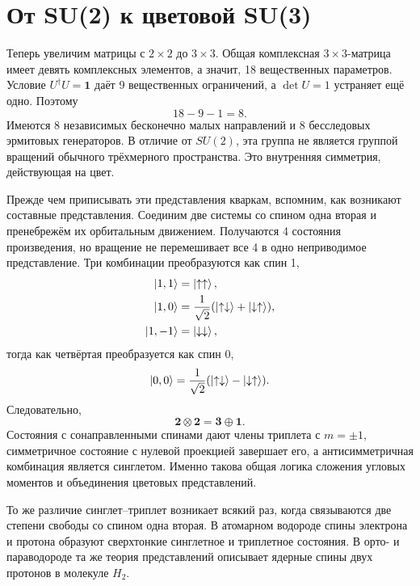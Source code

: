 \section{От SU(2) к цветовой SU(3)}

Теперь увеличим матрицы с \(2\times2\) до \(3\times3\). Общая комплексная
\(3\times3\)-матрица имеет девять комплексных элементов, а значит, 18 вещественных параметров.
Условие \(U^\dagger U=\boldsymbol 1\) даёт 9 вещественных ограничений,
а \(\det U=1\) устраняет ещё одно. Поэтому
\begin{equation}
18-9-1=8.
\end{equation}
Имеются 8 независимых бесконечно малых направлений и 8 бесследовых
эрмитовых генераторов. В отличие от \(SU(2)\), эта группа не является группой вращений
обычного трёхмерного пространства. Это внутренняя симметрия, действующая на
цвет.

Прежде чем приписывать эти представления кваркам, вспомним, как возникают составные
представления. Соединим две системы со спином одна вторая и пренебрежём
их орбитальным движением. Получаются 4 состояния произведения, но вращение не перемешивает все 4 в одно неприводимое представление. Три комбинации преобразуются как спин 1,
\begin{align}
\left\lvert1,1\right\rangle&=\left\lvert\uparrow\uparrow\right\rangle,\\
\left\lvert1,0\right\rangle&=\frac{1}{\sqrt2}
(\left\lvert\uparrow\downarrow\right\rangle+\left\lvert\downarrow\uparrow\right\rangle),\\
\left\lvert1,-1\right\rangle&=\left\lvert\downarrow\downarrow\right\rangle,
\end{align}
тогда как четвёртая преобразуется как спин 0,
\begin{equation}
\left\lvert0,0\right\rangle=\frac{1}{\sqrt2}
(\left\lvert\uparrow\downarrow\right\rangle-\left\lvert\downarrow\uparrow\right\rangle).
\end{equation}
Следовательно,
\begin{equation}
\boldsymbol 2\otimes\boldsymbol 2
=\boldsymbol 3\oplus\boldsymbol 1.
\label{eq:l4-two-spin-decomposition}
\end{equation}
Состояния с сонаправленными спинами дают члены триплета с \(m=\pm1\), симметричное
состояние с нулевой проекцией завершает его, а антисимметричная комбинация является
синглетом. Именно такова общая логика сложения угловых моментов и объединения
цветовых представлений.

То же различие синглет--триплет возникает всякий раз, когда связываются две степени свободы
со спином одна вторая. В атомарном водороде спины электрона и протона
образуют сверхтонкие синглетное и триплетное состояния. В орто- и параводороде
та же теория представлений описывает ядерные спины двух протонов в молекуле
\(H_2\).

